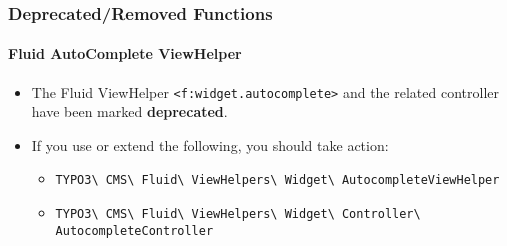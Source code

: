 \begin{frame}[fragile]
	\frametitle{Deprecated/Removed Functions}
	\framesubtitle{Fluid AutoComplete ViewHelper}

	\begin{itemize}
		\item The Fluid ViewHelper \texttt{<f:widget.autocomplete>} and the related controller
			have been marked \textbf{deprecated}.
		\item If you use or extend the following, you should take action:

			\begin{itemize}\smaller
				\item \texttt{TYPO3\textbackslash
					CMS\textbackslash
					Fluid\textbackslash
					ViewHelpers\textbackslash
					Widget\textbackslash
					AutocompleteViewHelper}
				\item \texttt{TYPO3\textbackslash
					CMS\textbackslash
					Fluid\textbackslash
					ViewHelpers\textbackslash
					Widget\textbackslash
					Controller\textbackslash
					AutocompleteController}
			\end{itemize}

	\end{itemize}

\end{frame}


